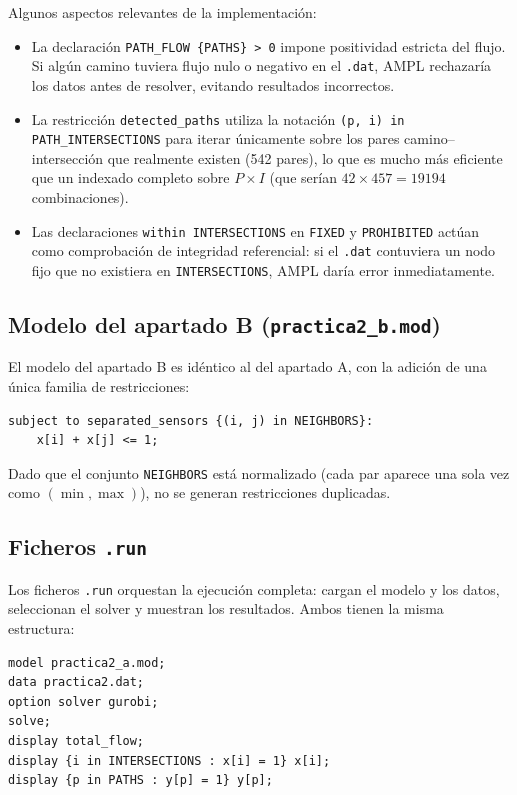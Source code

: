 \documentclass[12pt,a4paper]{article}
\begin{document}
Algunos aspectos relevantes de la implementación:

\begin{itemize}[itemsep=4pt]
    \item La declaración \texttt{PATH\_FLOW \{PATHS\} > 0} impone positividad estricta del flujo. Si algún camino tuviera flujo nulo o negativo en el \texttt{.dat}, AMPL rechazaría los datos antes de resolver, evitando resultados incorrectos.
    \item La restricción \texttt{detected\_paths} utiliza la notación \texttt{(p, i) in PATH\_INTERSECTIONS} para iterar únicamente sobre los pares camino--intersección que realmente existen (542 pares), lo que es mucho más eficiente que un indexado completo sobre $P \times I$ (que serían $42 \times 457 = 19194$ combinaciones).
    \item Las declaraciones \texttt{within INTERSECTIONS} en \texttt{FIXED} y \texttt{PROHIBITED} actúan como comprobación de integridad referencial: si el \texttt{.dat} contuviera un nodo fijo que no existiera en \texttt{INTERSECTIONS}, AMPL daría error inmediatamente.
\end{itemize}

\subsection{Modelo del apartado B (\texttt{practica2\_b.mod})}

El modelo del apartado B es idéntico al del apartado A, con la adición de una única familia de restricciones:

\begin{lstlisting}[caption={Restricción adicional en el apartado B}]
subject to separated_sensors {(i, j) in NEIGHBORS}:
    x[i] + x[j] <= 1;
\end{lstlisting}

Dado que el conjunto \texttt{NEIGHBORS} está normalizado (cada par aparece una sola vez como $(\min,\max)$), no se generan restricciones duplicadas.

\subsection{Ficheros \texttt{.run}}

Los ficheros \texttt{.run} orquestan la ejecución completa: cargan el modelo y los datos, seleccionan el solver y muestran los resultados. Ambos tienen la misma estructura:

\begin{lstlisting}[caption={Fichero \texttt{practica2\_a.run} (análogo para el apartado B)}]
model practica2_a.mod;
data practica2.dat;
option solver gurobi;
solve;
display total_flow;
display {i in INTERSECTIONS : x[i] = 1} x[i];
display {p in PATHS : y[p] = 1} y[p];
\end{lstlisting}
\end{document}
